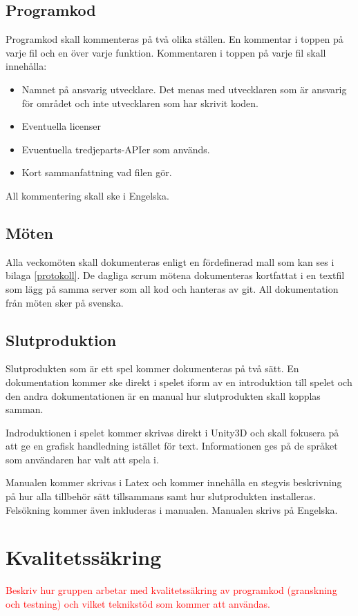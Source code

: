 \documentclass[a4paper,12pt,oneside,final]{extbook}
\begin{document}
\subsection{Programkod}
Programkod skall kommenteras på två olika ställen. En kommentar i toppen på varje fil och en över varje funktion. Kommentaren i toppen på varje fil skall innehålla:
\begin{itemize}
	\item Namnet på ansvarig utvecklare. Det menas med utvecklaren som är ansvarig för området och inte utvecklaren som har skrivit koden.
	\item Eventuella licenser
	\item Evuentuella tredjeparts-APIer som används.
	\item Kort sammanfattning vad filen gör.
\end{itemize}
All kommentering skall ske i Engelska.
\subsection{Möten}
Alla veckomöten skall dokumenteras enligt en fördefinerad mall som kan ses i bilaga \ref{protokoll}. De dagliga scrum mötena dokumenteras kortfattat i en textfil som lägg på samma server som all kod och hanteras av git. All dokumentation från möten sker på svenska.
\subsection{Slutproduktion}
Slutprodukten som är ett spel kommer dokumenteras på två sätt. En dokumentation kommer ske direkt i spelet iform av en introduktion till spelet och den andra dokumentationen är en manual hur slutprodukten skall kopplas samman. 

Indroduktionen i spelet kommer skrivas direkt i Unity3D och skall fokusera på att ge en grafisk handledning istället för text. Informationen ges på de språket som användaren har valt att spela i.

Manualen kommer skrivas i Latex och kommer innehålla en stegvis beskrivning på hur alla tillbehör sätt tillsammans samt hur slutprodukten installeras. Felsökning kommer även inkluderas i manualen. Manualen skrivs på Engelska.

\section{Kvalitetssäkring}

\textcolor{red}{Beskriv hur gruppen arbetar med kvalitetssäkring av programkod (granskning och testning) och vilket
teknikstöd som kommer att användas.
}
\end{document}
